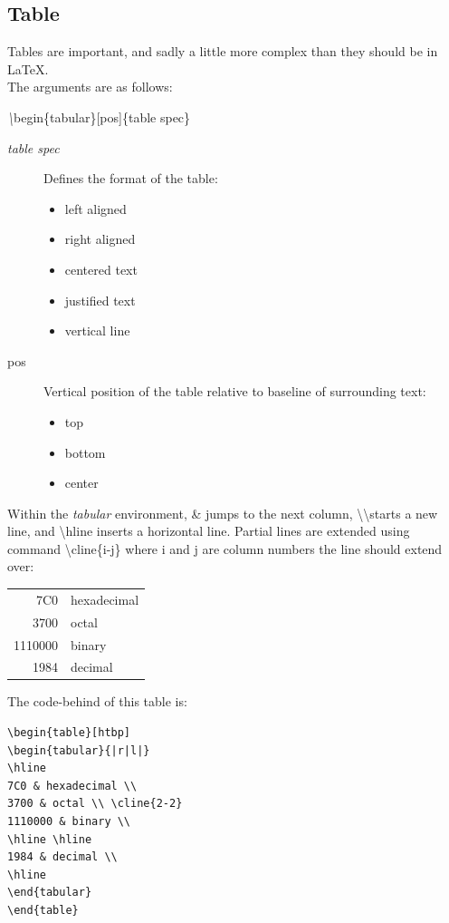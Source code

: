 \documentclass[10pt, a4paper]{article}
\begin{document}
\subsection{Table}
Tables are important, and sadly a little more complex than they should be in \LaTeX. \\
The arguments are as follows:\\
\begin{center}
\emph{\textbackslash}begin\{tabular\}[pos]\{table spec\}
\end{center}
\begin{description}
\item[\textsl{table spec}] Defines the format of the table:
\begin{itemize}
\item[l] left aligned
\item[r] right aligned
\item[c] centered text
\item[p\{width\}] justified text
\item[|] vertical line
\end{itemize}
\item[pos] Vertical position of the table relative to baseline of surrounding text:
\begin{itemize}
\item[t] top
\item[b] bottom
\item[c] center
\end{itemize}
\end{description}

Within the \emph{tabular} environment, \& jumps to the next column, \textbackslash\textbackslash starts a new line, and \textbackslash hline inserts a horizontal line. Partial lines are extended using command \textbackslash cline\{i-j\} where i and j are column numbers the line should extend over:
\begin{table}[htbp]
\begin{tabular}{|r|l|}
\hline 
7C0 & hexadecimal \\ 
3700 & octal \\ \cline{2-2}
1110000 & binary \\ 
\hline \hline
1984 & decimal \\ 
\hline 
\end{tabular} 
\end{table}

The code-behind of this table is:
\begin{verbatim}
\begin{table}[htbp]
\begin{tabular}{|r|l|}
\hline 
7C0 & hexadecimal \\ 
3700 & octal \\ \cline{2-2}
1110000 & binary \\ 
\hline \hline
1984 & decimal \\ 
\hline 
\end{tabular} 
\end{table}
\end{verbatim}
\end{document}
